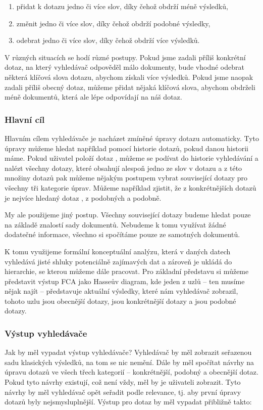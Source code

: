 \documentclass[12pt]{article}
\newcommand{\sssection}[1]{\subsubsection{#1}}
\begin{document}
\begin{enumerate}
\item přidat k dotazu jedno či více slov, díky čehož obdrží méně výsledků,
\item změnit jedno či více slov, díky čehož obdrží podobné výsledky,
\item odebrat jedno či více slov, díky čehož obdrží více výsledků.
\end{enumerate}

V různých situacích se hodí různé postupy. Pokud jsme zadali příliš konkrétní dotaz, na který vyhledávač odpověděl málo dokumenty, bude vhodné odebrat některá klíčová slova dotazu, abychom získali více výsledků. Pokud jsme naopak zadali příliš obecný dotaz, můžeme přidat nějaká klíčová slova, abychom obdrželi méně dokumentů, která ale lépe odpovídají na náš dotaz. 

\sssection{Hlavní cíl}

Hlavním cílem vyhledávače je nacházet zmíněné úpravy dotazu automaticky. Tyto úpravy můžeme hledat například pomocí historie dotazů, pokud danou historii máme. Pokud uživatel položí dotaz , můžeme se podívat do historie vyhledávání a nalézt všechny dotazy, které obsahují alespoň jedno ze slov v dotazu a z této množiny dotazů pak můžeme nějakým postupem vybrat související dotazy pro všechny tři kategorie úprav. Můžeme například zjistit, že z konkrétnějších dotazů je nejvíce hledaný dotaz , z podobných  a podobně. 

My ale použijeme jiný postup. Všechny související dotazy budeme hledat pouze na základě znalostí sady dokumentů. Nebudeme k tomu využívat žádné dodatečné informace, všechno si spočítáme pouze ze samotných dokumentů.

K tomu využijeme formální konceptuální analýzu, která v daných datech vyhledává jisté shluky potenciálně zajímavých dat a zároveň je ukládá do hierarchie, se kterou můžeme dále pracovat. Pro základní představu si můžeme představit výstup FCA jako Hasseův diagram, kde jeden z uzlů -- ten musíme nějak najít -- představuje aktuální výsledky, které nám vyhledávač zobrazil,  tohoto uzlu jsou obecnější dotazy,  jsou konkrétnější dotazy a  jsou podobné dotazy. 

\sssection{Výstup vyhledávače}

Jak by měl vypadat výstup vyhledávače? Vyhledávač by měl zobrazit seřazenou sadu klasických výsledků, na tom se nic nemění. Dále by měl spočítat návrhy na úpravu dotazů ve všech třech kategorií -- konkrétnější, podobný a obecnější dotaz. Pokud tyto návrhy existují, což není vždy, měl by je uživateli zobrazit. Tyto návrhy by měl vyhledávač opět seřadit podle relevance, tj. aby první úpravy dotazů byly nejsmysluplnější. Výstup pro dotaz  by měl vypadat přibližně takto:
\end{document}
